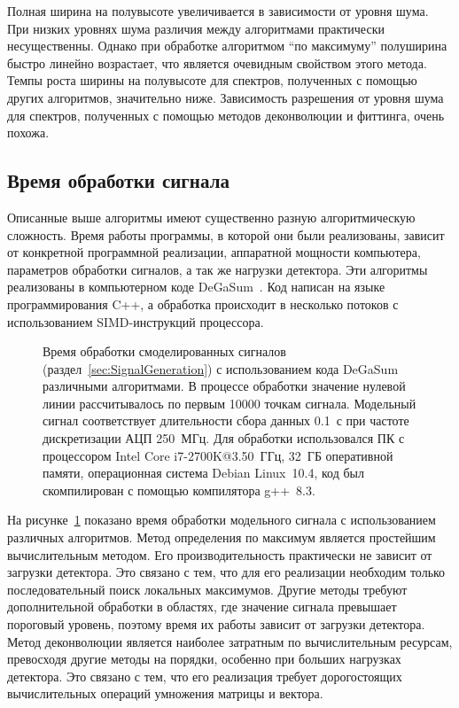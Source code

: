 Полная ширина на полувысоте увеличивается в зависимости от уровня шума. При низких уровнях шума различия между алгоритмами практически несущественны. Однако при обработке алгоритмом ``по максимуму'' полуширина быстро линейно возрастает, что является очевидным свойством этого метода. Темпы роста ширины на полувысоте для спектров, полученных с помощью других алгоритмов, значительно ниже. Зависимость разрешения от уровня шума для спектров, полученных с помощью методов деконволюции и фиттинга, очень похожа.~\cite{Khilkevitch2020}


\subsection{Время обработки сигнала}

Описанные выше алгоритмы имеют существенно разную алгоритмическую сложность. Время работы программы, в которой они были реализованы, зависит от конкретной программной реализации, аппаратной мощности компьютера, параметров обработки сигналов, а так же нагрузки детектора. Эти алгоритмы реализованы в компьютерном коде DeGaSum~\cite{Khilkevitch2020}. Код написан на языке программирования C++, а обработка происходит в несколько потоков с использованием SIMD-инструкций процессора.

\begin{figure}[ht!]
  \caption{ Время обработки смоделированных сигналов (раздел~\ref{sec:SignalGeneration}) с использованием кода DeGaSum различными алгоритмами. В процессе обработки значение нулевой линии рассчитывалось по первым 10000 точкам сигнала. Модельный сигнал соответствует длительности сбора данных 0.1~с при частоте дискретизации АЦП 250~МГц. Для обработки использовался ПК с процессором Intel Core i7-2700K@3.50~ГГц, 32~ГБ оперативной памяти, операционная система Debian Linux~10.4, код был скомпилирован с помощью компилятора g++~8.3.~\cite{Khilkevitch2020} }
  \label{fig:processingTime}
\end{figure}

На рисунке~\ref{fig:processingTime} показано время обработки модельного сигнала с использованием различных алгоритмов. Метод определения по максимум является простейшим вычислительным методом. Его производительность практически не зависит от загрузки детектора. Это связано с тем, что для его реализации необходим только последовательный поиск локальных максимумов. Другие методы требуют дополнительной обработки в областях, где значение сигнала превышает пороговый уровень, поэтому время их работы зависит от загрузки детектора. Метод деконволюции является наиболее затратным по вычислительным ресурсам, превосходя другие методы на порядки, особенно при больших нагрузках детектора. Это связано с тем, что его реализация требует дорогостоящих вычислительных операций умножения матрицы и вектора.~\cite{Khilkevitch2020}

